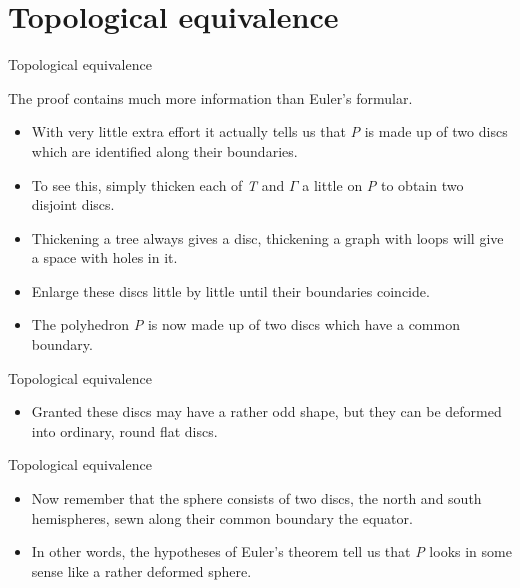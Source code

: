 \documentclass{beamer}
\begin{document}
\section{Topological equivalence}

\begin{frame}{Topological equivalence}
  \begin{block}{}
    The proof contains much more information than Euler's formular.
    \begin{itemize}
    \item With very little extra effort it actually tells us that \textsl{P} is made up of two discs which are identified along their boundaries.
    \item To see this, simply thicken each of \textsl{T} and $\Gamma$ a little on \textsl{P} to obtain two disjoint discs.
    \item Thickening a tree always gives a disc, thickening a graph with loops will give a space with holes in it.
    \item Enlarge these discs little by little until their boundaries coincide.
    \item The polyhedron \textsl{P} is now made up of two discs which have a common boundary.
    \end{itemize}
  \end{block}
\end{frame}

\begin{frame}{Topological equivalence}
  \begin{block}{}
    \begin{itemize}
    \item Granted these discs may have a rather odd shape, but they can be deformed into ordinary, round flat discs.
    \end{itemize}
  \end{block}
\end{frame}

\begin{frame}{Topological equivalence}
  \begin{block}{}
    \begin{itemize}
    \item Now remember that the sphere consists of two discs, the north and south hemispheres, sewn along their common boundary the equator.
    \item In other words, the hypotheses of Euler's theorem tell us that \textsl{P} looks in some sense like a rather deformed sphere.
    \end{itemize}
  \end{block}
\end{frame}
\end{document}
